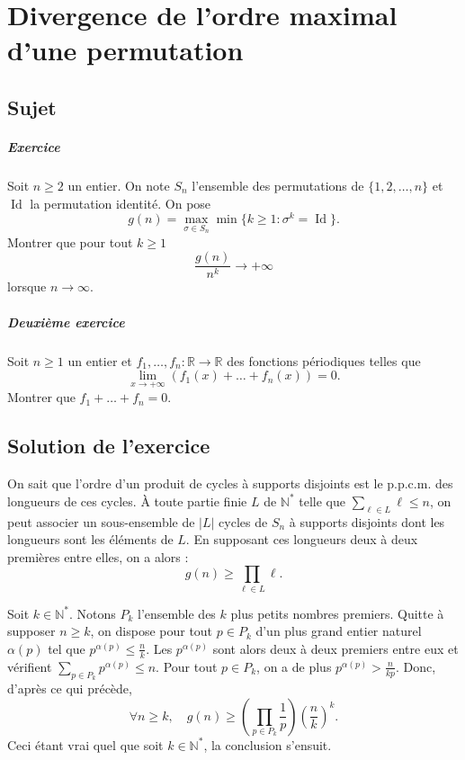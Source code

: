 \chapter{Divergence de l'ordre maximal d'une permutation}

\section{Sujet}

\paragraph{Exercice}

Soit $n \geqslant 2$ un entier.
On note $S_n$ l'ensemble des permutations de $\{1,2,\dots,n\}$ et $\operatorname{Id}$ la permutation identité.
On pose
$$
g(n) = \max_{\sigma \in S_n} \min \{k \geqslant 1 : \sigma^k = \operatorname{Id}\}.
$$
Montrer que pour tout $k \geqslant 1$
\[\frac{g(n)}{n^k} \to +\infty
\]
lorsque $n \to \infty$.

\paragraph{Deuxième exercice}

Soit $n \geqslant 1$ un entier et $f_1,\dots,f_n : \mathbb R \to \mathbb R$ des fonctions périodiques telles que
$$
\lim_{x\to+\infty} (f_1(x) + \dots + f_n(x)) = 0.
$$
Montrer que $f_1 + \dots + f_n = 0$.

\section{Solution de l'exercice}


On sait que l'ordre d'un produit de cycles à supports disjoints est le p.p.c.m. des longueurs de ces cycles.
À toute partie finie $L$ de $\mathbb N^*$ telle que $\sum_{\ell\in L} \ell \leqslant n$, on peut associer un sous-ensemble de $|L|$ cycles de $S_n$ à supports disjoints dont les longueurs sont les éléments de $L$.
En supposant ces longueurs deux à deux premières entre elles, on a alors :
$$
g(n) \geqslant \prod_{\ell \in L} \ell.
$$

Soit $k \in \mathbb N^*$. Notons $P_k$ l'ensemble des $k$ plus petits nombres premiers.
Quitte à supposer $n \geqslant k$, on dispose pour tout $p \in P_k$ d'un plus grand entier naturel $\alpha(p)$ tel que $p^{\alpha(p)} \leqslant \frac nk$.
Les $p^{\alpha(p)}$ sont alors deux à deux premiers entre eux et vérifient $\sum_{p\in P_k} p^{\alpha(p)} \leqslant n$.
Pour tout $p \in P_k$, on a de plus $p^{\alpha(p)} > \frac n{kp}$. Donc, d'après ce qui précède,
$$
\forall n \geqslant k,\quad
g(n) \geqslant \left(\prod_{p\in P_k} \frac1p\right)\left(\frac nk\right)^k.
$$
Ceci étant vrai quel que soit $k \in \mathbb N^*$, la conclusion s'ensuit.

